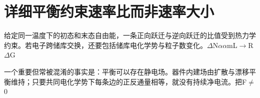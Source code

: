 \documentclass[11pt,a4paper]{article}
\begin{document}
\section{{\cjkfont 详细平衡约束速率比而非速率大小}\allowbreak{}}\label{sec:19}
{\cjkfont 给定同一温度下的初态和末态自由能，一条正向跃迁与逆向跃迁的比值受到热力学约束。若电子跨储库交换，还要包括储库电化学势与粒子数变化。}\allowbreak{}\ensuremath{\Delta}N\ensuremath{\alpha}\allowbreak{}\ensuremath{\alpha}\allowbreak{}m\allowbreak{}L\ensuremath{\to}R\allowbreak{}\ensuremath{\Delta}G\allowbreak{}
\par
{\cjkfont 一个重要但常被混淆的事实是：平衡可以存在静电场。器件内建场由扩散与漂移平衡维持；只要共同电化学势下每条边的正反通量相等，就没有持续净电流。把}\allowbreak{}F\ensuremath{\ne}\allowbreak{}0\allowbreak{}
\par
\end{document}

